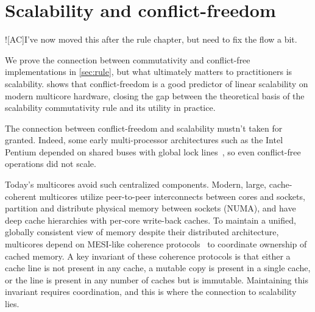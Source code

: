\section{Scalability and conflict-freedom}
\label{sec:scalability}



\XXX![AC]{I've now moved this after the rule chapter, but need to fix
  the flow a bit.}






We prove the connection between commutativity and conflict-free
implementations in \cref{sec:rule}, but what ultimately matters to
practitioners is scalability.   shows that
conflict-freedom is a good predictor of linear scalability on modern
multicore hardware, closing the gap between the theoretical basis of
the scalability commutativity rule and its utility in practice.

The connection between conflict-freedom and scalability mustn't taken
for granted.  Indeed, some early multi-processor architectures such as
the Intel Pentium depended on shared buses with global lock
lines~\cite[\S8.1.4]{intel-sdm-3}, so even conflict-free operations
did not scale.

Today's multicores avoid such centralized components.  Modern, large,
cache-coherent multicores utilize peer-to-peer interconnects between
cores and sockets, partition and distribute physical memory between
sockets (NUMA), and have deep cache hierarchies with per-core
write-back caches.
%
To maintain a unified, globally consistent view of memory despite
their distributed architecture, multicores depend on MESI-like
coherence protocols~\cite{papamarcos:mesi} to coordinate ownership of
cached memory.
%
A key invariant of these coherence protocols is that either a cache
line is not present in any cache, a mutable copy is present in a
single cache, or the line is present in any number of caches but is
immutable.
%
Maintaining this invariant requires coordination, and this is where
the connection to scalability lies.

